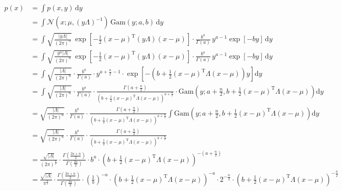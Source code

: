 \documentclass[a4paper,12pt,twoside]{book}
\begin{document}
\begin{equation} \label{eq:ng-marg-ng-marg-x-qed}
\begin{split}
p(x) &= \int p(x,y) \, \mathrm{d}y \\
&= \int \mathcal{N}(x; \mu, (y \Lambda)^{-1}) \, \mathrm{Gam}(y; a, b) \, \mathrm{d}y \\
&= \int \sqrt{\frac{|y \Lambda|}{(2 \pi)^n}} \, \exp \left[ -\frac{1}{2} (x-\mu)^\mathrm{T} (y \Lambda) (x-\mu) \right] \cdot \frac{b^a}{\Gamma(a)} \, y^{a-1} \exp[-b y] \, \mathrm{d}y \\
&= \int \sqrt{\frac{y^n |\Lambda|}{(2 \pi)^n}} \, \exp \left[ -\frac{1}{2} (x-\mu)^\mathrm{T} (y \Lambda) (x-\mu) \right] \cdot \frac{b^a}{\Gamma(a)} \, y^{a-1} \exp[-b y] \, \mathrm{d}y \\
&= \int \sqrt{\frac{|\Lambda|}{(2 \pi)^n}} \cdot \frac{b^a}{\Gamma(a)} \cdot y^{a+\frac{n}{2}-1} \cdot \exp \left[ -\left( b + \frac{1}{2} (x-\mu)^\mathrm{T} \Lambda (x-\mu) \right) y \right] \mathrm{d}y \\
&= \int \sqrt{\frac{|\Lambda|}{(2 \pi)^n}} \cdot \frac{b^a}{\Gamma(a)} \cdot \frac{\Gamma\left( a+\frac{n}{2} \right)}{\left( b + \frac{1}{2} (x-\mu)^\mathrm{T} \Lambda (x-\mu) \right)^{a+\frac{n}{2}}} \cdot \mathrm{Gam}\left( y; a+\frac{n}{2}, b + \frac{1}{2} (x-\mu)^\mathrm{T} \Lambda (x-\mu) \right) \mathrm{d}y \\
&= \sqrt{\frac{|\Lambda|}{(2 \pi)^n}} \cdot \frac{b^a}{\Gamma(a)} \cdot \frac{\Gamma\left( a+\frac{n}{2} \right)}{\left( b + \frac{1}{2} (x-\mu)^\mathrm{T} \Lambda (x-\mu) \right)^{a+\frac{n}{2}}} \int \mathrm{Gam}\left( y; a+\frac{n}{2}, b + \frac{1}{2} (x-\mu)^\mathrm{T} \Lambda (x-\mu) \right) \mathrm{d}y \\
&= \sqrt{\frac{|\Lambda|}{(2 \pi)^n}} \cdot \frac{b^a}{\Gamma(a)} \cdot \frac{\Gamma\left( a+\frac{n}{2} \right)}{\left( b + \frac{1}{2} (x-\mu)^\mathrm{T} \Lambda (x-\mu) \right)^{a+\frac{n}{2}}} \\
&= \frac{\sqrt{|\Lambda|}}{(2 \pi)^\frac{n}{2}} \cdot \frac{\Gamma\left( \frac{2a+n}{2} \right)}{\Gamma\left( \frac{2a}{2} \right)} \cdot b^a \cdot \left( b + \frac{1}{2} (x-\mu)^\mathrm{T} \Lambda (x-\mu) \right)^{-\left( a+\frac{n}{2} \right)} \\
&= \frac{\sqrt{|\Lambda|}}{\pi^\frac{n}{2}} \cdot \frac{\Gamma\left( \frac{2a+n}{2} \right)}{\Gamma\left( \frac{2a}{2} \right)} \cdot \left( \frac{1}{b} \right)^{-a} \cdot \left( b + \frac{1}{2} (x-\mu)^\mathrm{T} \Lambda (x-\mu) \right)^{-a} \cdot 2^{-\frac{n}{2}} \cdot \left( b + \frac{1}{2} (x-\mu)^\mathrm{T} \Lambda (x-\mu) \right)^{-\frac{n}{2}} \\

\end{split}
\end{equation}
\end{document}

